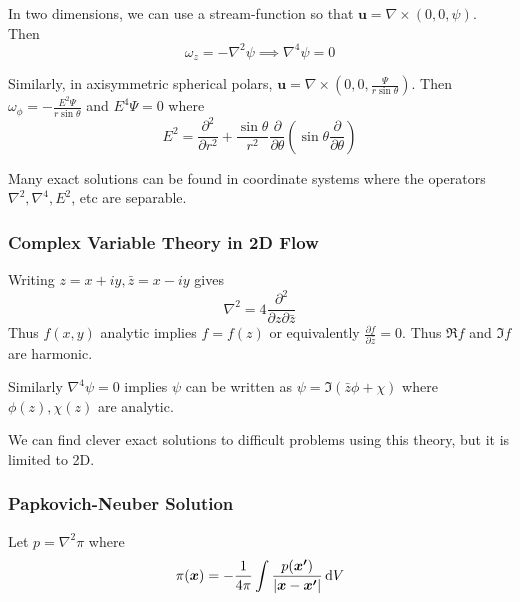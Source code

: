 \documentclass{jknotes}
\begin{document}
In two dimensions, we can use a stream-function so that $\bm{u} = \nabla
\times (0,0,\psi)$. Then
\begin{equation}
	\omega_z = -\nabla^2 \psi \implies \nabla^4 \psi = 0
\end{equation}

Similarly, in axisymmetric spherical polars, $\bm{u} = \nabla \times
(0,0,\frac{\Psi}{r \sin \theta})$. Then $\omega_\phi = -\frac{E^2 \Psi}{r\sin
\theta}$ and $E^4 \Psi = 0$ where
\begin{equation}
	E^2 = \frac{\partial^2}{\partial r^2} + \frac{\sin \theta}{r^2}
	\frac{\partial}{\partial \theta} \left( \sin \theta
	\frac{\partial}{\partial \theta}\right)
\end{equation}

Many exact solutions can be found in coordinate systems where the operators
$\nabla^2, \nabla^4, E^2$, etc are separable.

\subsubsection{Complex Variable Theory in 2D Flow}
Writing $z = x+iy, \bar{z} = x-iy$ gives
\begin{equation}
	\nabla^2 = 4 \frac{\partial^2}{\partial z \partial \bar{z}}
\end{equation}
Thus $f(x,y)$ analytic implies $f = f(z)$ or equivalently $\frac{\partial
f}{\partial \bar{z}} = 0$. Thus $\Re f$ and $\Im f$ are harmonic.

Similarly $\nabla^4 \psi = 0$ implies $\psi$ can be written as $\psi =
\Im(\bar{z}\phi + \chi)$ where $\phi(z), \chi(z)$ are analytic.

We can find clever exact solutions to difficult problems using this theory,
but it is limited to 2D.

\subsubsection{Papkovich-Neuber Solution}
Let $p = \nabla^2 \pi$ where
\begin{equation}
	\pi(\bm{x}) = -\frac{1}{4\pi} \int \frac{p(\bm{x'})}{\left|
	\bm{x}-\bm{x'}\right|} \, \diffd V
\end{equation}
\end{document}
